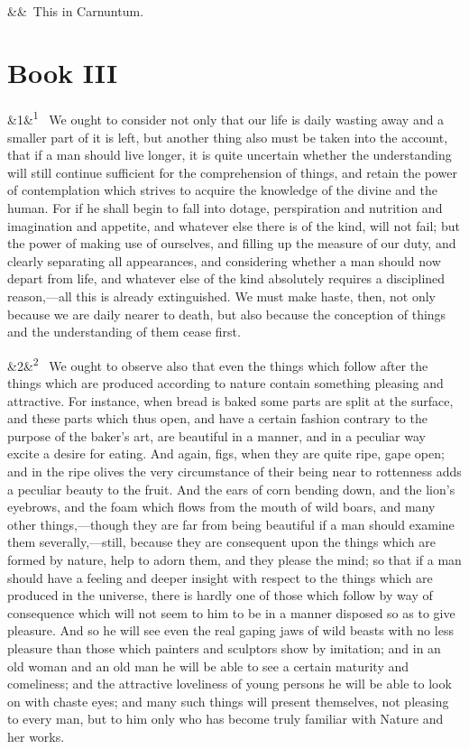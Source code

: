 \documentclass[12pt]{article}
\newcommand{\para}[1][]{\par\noindent\ifx&#1&\else\textsuperscript{\footnotesize #1}~\fi}
\begin{document}
\para This in Carnuntum.

\section*{Book III}

\para[1] We ought to consider not only that our life is daily wasting away and a
smaller part of it is left, but another thing also must be taken into
the account, that if a man should live longer, it is quite uncertain
whether the understanding will still continue sufficient for the
comprehension of things, and retain the power of contemplation which
strives to acquire the knowledge of the divine and the human. For if he
shall begin to fall into dotage, perspiration and nutrition and
imagination and appetite, and whatever else there is of the kind, will
not fail; but the power of making use of ourselves, and filling up the
measure of our duty, and clearly separating all appearances, and
considering whether a man should now depart from life, and whatever else
of the kind absolutely requires a disciplined reason,---all this is
already extinguished. We must make haste, then, not only because we are
daily nearer to death, but also because the conception of things and the
understanding of them cease first.

\para[2] We ought to observe also that even the things which follow after the
things which are produced according to nature contain something pleasing
and attractive. For instance, when bread is baked some parts are split
at the surface, and these parts which thus open, and have a certain
fashion contrary to the purpose of the baker's art, are beautiful in a
manner, and in a peculiar way excite a desire for eating. And again,
figs, when they are quite ripe, gape open; and in the ripe olives the
very circumstance of their being near to rottenness adds a peculiar
beauty to the fruit. And the ears of corn bending down, and the lion's
eyebrows, and the foam which flows from the mouth of wild boars, and
many other things,---though they are far from being beautiful if a man
should examine them severally,---still, because they are consequent upon
the things which are formed by nature, help to adorn them, and they
please the mind; so that if a man should have a feeling and deeper
insight with respect to the things which are produced in the universe,
there is hardly one of those which follow by way of consequence which
will not seem to him to be in a manner disposed so as to give pleasure.
And so he will see even the real gaping jaws of wild beasts with no less
pleasure than those which painters and sculptors show by imitation; and
in an old woman and an old man he will be able to see a certain maturity
and comeliness; and the attractive loveliness of young persons he will
be able to look on with chaste eyes; and many such things will present
themselves, not pleasing to every man, but to him only who has become
truly familiar with Nature and her works.
\end{document}
